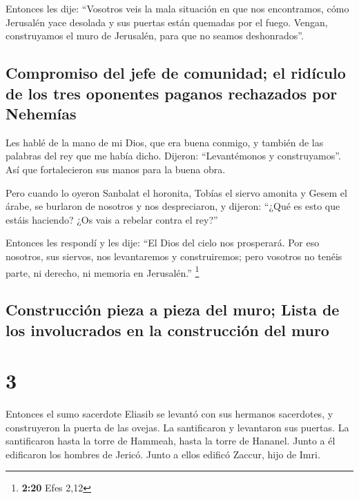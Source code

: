  Entonces les dije: ``Vosotros veis la mala situación en
que nos encontramos, cómo Jerusalén yace desolada y sus puertas están
quemadas por el fuego. Vengan, construyamos el muro de Jerusalén, para
que no seamos deshonrados''.

\hypertarget{compromiso-del-jefe-de-comunidad-el-riduxedculo-de-los-tres-oponentes-paganos-rechazados-por-nehemuxedas}{%
\subsection{Compromiso del jefe de comunidad; el ridículo de los tres
oponentes paganos rechazados por
Nehemías}\label{compromiso-del-jefe-de-comunidad-el-riduxedculo-de-los-tres-oponentes-paganos-rechazados-por-nehemuxedas}}

 Les hablé de la mano de mi Dios, que era buena conmigo,
y también de las palabras del rey que me había dicho. Dijeron:
``Levantémonos y construyamos''. Así que fortalecieron sus manos para la
buena obra.

 Pero cuando lo oyeron Sanbalat el horonita, Tobías el
siervo amonita y Gesem el árabe, se burlaron de nosotros y nos
despreciaron, y dijeron: ``¿Qué es esto que estáis haciendo? ¿Os vais a
rebelar contra el rey?''

 Entonces les respondí y les dije: ``El Dios del cielo
nos prosperará. Por eso nosotros, sus siervos, nos levantaremos y
construiremos; pero vosotros no tenéis parte, ni derecho, ni memoria en
Jerusalén.'' \footnote{\textbf{2:20} Efes 2,12}

\hypertarget{construcciuxf3n-pieza-a-pieza-del-muro-lista-de-los-involucrados-en-la-construcciuxf3n-del-muro}{%
\subsection{Construcción pieza a pieza del muro; Lista de los
involucrados en la construcción del
muro}\label{construcciuxf3n-pieza-a-pieza-del-muro-lista-de-los-involucrados-en-la-construcciuxf3n-del-muro}}

\hypertarget{section-2}{%
\section{3}\label{section-2}}

 Entonces el sumo sacerdote Eliasib se levantó con sus
hermanos sacerdotes, y construyeron la puerta de las ovejas. La
santificaron y levantaron sus puertas. La santificaron hasta la torre de
Hammeah, hasta la torre de Hananel.  Junto a él edificaron
los hombres de Jericó. Junto a ellos edificó Zaccur, hijo de Imri.

